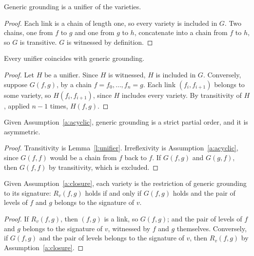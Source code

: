 \documentclass{situationist-preprint}
\begin{document}
\begin{lemma}\label{l:unifier}
Generic grounding is a unifier of the varieties.
\end{lemma}

\begin{proof}
Each link is a chain of length one, so every variety is included in $G$. Two chains, one from $f$ to $g$ and one from $g$ to $h$, concatenate into a chain from $f$ to $h$, so $G$ is transitive. $G$ is witnessed by definition.
\end{proof}

\begin{lemma}[Uniqueness]\label{l:unique}
Every unifier coincides with generic grounding.
\end{lemma}

\begin{proof}
Let $H$ be a unifier. Since $H$ is witnessed, $H$ is included in $G$. Conversely, suppose $G(f,g)$, by a chain $f = f_0, \ldots, f_n = g$. Each link $(f_i, f_{i+1})$ belongs to some variety, so $H(f_i, f_{i+1})$, since $H$ includes every variety. By transitivity of $H$, applied $n - 1$ times, $H(f, g)$.
\end{proof}

\begin{proposition}\label{p:spo}
Given Assumption~\ref{a:acyclic}, generic grounding is a strict partial order, and it is asymmetric.
\end{proposition}

\begin{proof}
Transitivity is Lemma~\ref{l:unifier}. Irreflexivity is Assumption~\ref{a:acyclic}, since $G(f,f)$ would be a chain from $f$ back to $f$. If $G(f,g)$ and $G(g,f)$, then $G(f,f)$ by transitivity, which is excluded.
\end{proof}

\begin{proposition}\label{p:restriction}
Given Assumption~\ref{a:closure}, each variety is the restriction of generic grounding to its signature: $R_v(f,g)$ holds if and only if $G(f,g)$ holds and the pair of levels of $f$ and $g$ belongs to the signature of $v$.
\end{proposition}

\begin{proof}
If $R_v(f,g)$, then $(f,g)$ is a link, so $G(f,g)$; and the pair of levels of $f$ and $g$ belongs to the signature of $v$, witnessed by $f$ and $g$ themselves. Conversely, if $G(f,g)$ and the pair of levels belongs to the signature of $v$, then $R_v(f,g)$ by Assumption~\ref{a:closure}.
\end{proof}
\end{document}
